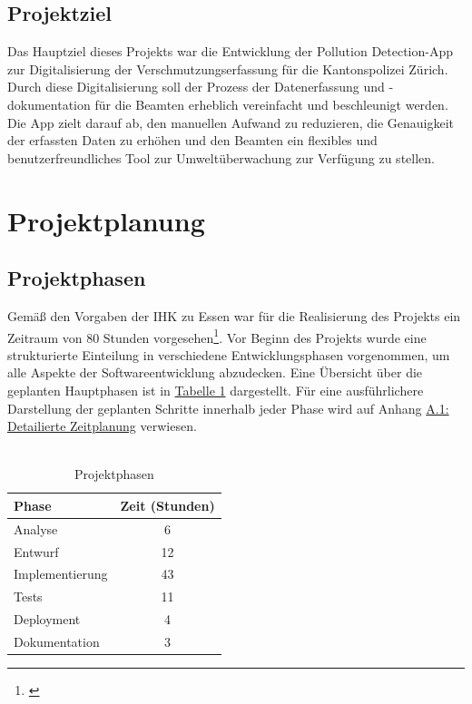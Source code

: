 \documentclass[a4paper,12pt]{article}
\begin{document}
\subsection{Projektziel}
Das Hauptziel dieses Projekts war die Entwicklung der \glqq Pollution Detection\grqq{}-App zur Digitalisierung der Verschmutzungserfassung für die Kantonspolizei Zürich. Durch diese Digitalisierung soll der Prozess der Datenerfassung und -dokumentation für die Beamten erheblich vereinfacht und beschleunigt werden. Die App zielt darauf ab, den manuellen Aufwand zu reduzieren, die Genauigkeit der erfassten Daten zu erhöhen und den Beamten ein flexibles und benutzerfreundliches Tool zur Umweltüberwachung zur Verfügung zu stellen.

\section{Projektplanung}
\subsection{Projektphasen}
Gemäß den Vorgaben der IHK zu Essen war für die Realisierung des Projekts ein Zeitraum von 80 Stunden vorgesehen\footnote{\citeauthor{ihk2023essen}}. Vor Beginn des Projekts wurde eine strukturierte Einteilung in verschiedene Entwicklungsphasen vorgenommen, um alle Aspekte der Softwareentwicklung abzudecken. Eine Übersicht über die geplanten Hauptphasen ist in  \hyperlink{Projektphasen}{Tabelle 1} dargestellt. Für eine ausführlichere Darstellung der geplanten Schritte innerhalb jeder Phase wird auf Anhang \hyperref[sec:detaillierte zeitplanung]{A.1: Detailierte Zeitplanung} verwiesen.\\
\\

\hypertarget{Projektphasen}{}
\begin{table}[h]
\centering
\begin{tabularx}{\textwidth}{|X|c|}
    \hline
    \rowcolor{gray}\textbf{Phase} & \textbf{Zeit (Stunden)} \\
    \hline
    Analyse & 6 \\
    \hline
    Entwurf & 12 \\
    \hline
    Implementierung & 43 \\
    \hline
    Tests & 11 \\
    \hline
    Deployment & 4 \\
    \hline
    Dokumentation & 3 \\
    \hline
\end{tabularx}
\caption{Projektphasen}
\label{tab:Projektphasen}
\end{table}
\end{document}
